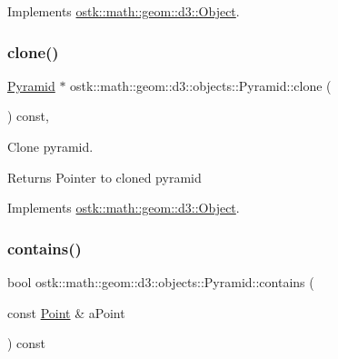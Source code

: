 Implements \hyperlink{classostk_1_1math_1_1geom_1_1d3_1_1_object_ae9194dd6d2bb4df09292ffc84dccdb1d}{ostk\+::math\+::geom\+::d3\+::\+Object}.

\mbox{\label{classostk_1_1math_1_1geom_1_1d3_1_1objects_1_1_pyramid_aefdaacc9298ef9d9a26137b2976f7dc6}} 
\subsubsection{\texorpdfstring{clone()}{clone()}}
{\footnotesize\ttfamily \hyperlink{classostk_1_1math_1_1geom_1_1d3_1_1objects_1_1_pyramid}{Pyramid} $\ast$ ostk\+::math\+::geom\+::d3\+::objects\+::\+Pyramid\+::clone (\begin{DoxyParamCaption}{ }\end{DoxyParamCaption}) const\hspace{0.3cm}{\ttfamily [override]}, {\ttfamily [virtual]}}



Clone pyramid. 

\begin{DoxyReturn}{Returns}
Pointer to cloned pyramid 
\end{DoxyReturn}


Implements \hyperlink{classostk_1_1math_1_1geom_1_1d3_1_1_object_a676013f9555f6492687f9809b2db887b}{ostk\+::math\+::geom\+::d3\+::\+Object}.

\mbox{\label{classostk_1_1math_1_1geom_1_1d3_1_1objects_1_1_pyramid_a7f476c37cc3f014bdc24e7fa4f2da743}} 
\subsubsection{\texorpdfstring{contains()}{contains()}\hspace{0.1cm}{\footnotesize\ttfamily [1/4]}}
{\footnotesize\ttfamily bool ostk\+::math\+::geom\+::d3\+::objects\+::\+Pyramid\+::contains (\begin{DoxyParamCaption}\item[{const \hyperlink{classostk_1_1math_1_1geom_1_1d3_1_1objects_1_1_point}{Point} \&}]{a\+Point }\end{DoxyParamCaption}) const}



